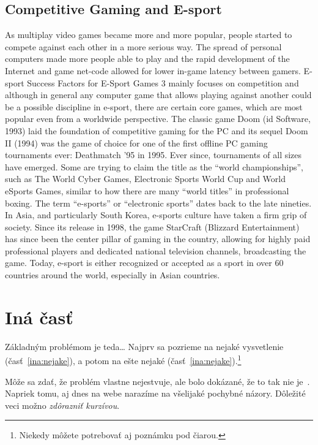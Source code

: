 \documentclass[10pt,twoside,slovak,a4paper]{article}
\begin{document}
\subsection{Competitive Gaming and E-sport} 
As multiplay video games became more and more popular, people started to compete against each other in a more serious way. The spread of personal computers made more people able to play and the rapid development of the Internet and game net-code allowed for lower in-game latency between gamers. E-sport Success Factors for E-Sport Games 3 mainly focuses on competition and although in general any computer game that allows playing against another could be a possible discipline in e-sport, there are certain core games, which are most popular even from a worldwide perspective. The classic game Doom (id Software, 1993) laid the foundation of competitive gaming for the PC and its sequel Doom II (1994) was the game of choice for one of the first offline PC gaming tournaments ever: Deathmatch ’95 in 1995. Ever since, tournaments of all sizes have emerged. Some are trying to claim the title as the “world championships”, such as The World Cyber Games, Electronic Sports World Cup and World eSports Games, similar to how there are many “world titles” in professional boxing. The term “e-sports” or “electronic sports” dates back to the late nineties. In Asia, and particularly South Korea, e-sports culture have taken a firm grip of society. Since its release in 1998, the game StarCraft (Blizzard Entertainment) has since been the center pillar of gaming in the country, allowing for highly paid professional players and dedicated national television channels, broadcasting the game. Today, e-sport is either recognized or accepted as a sport in over 60 countries around the world, especially in Asian countries.

\section{Iná časť} \label{ina}

Základným problémom je teda\ldots{} Najprv sa pozrieme na nejaké vysvetlenie (časť~\ref{ina:nejake}), a potom na ešte nejaké (časť~\ref{ina:nejake}).\footnote{Niekedy môžete potrebovať aj poznámku pod čiarou.}

Môže sa zdať, že problém vlastne nejestvuje\cite{Coplien:MPD}, ale bolo dokázané, že to tak nie je~\cite{Czarnecki:Staged, Czarnecki:Progress}. Napriek tomu, aj dnes na webe narazíme na všelijaké pochybné názory\cite{PLP-Framework}. Dôležité veci možno \emph{zdôrazniť kurzívou}.
\end{document}
